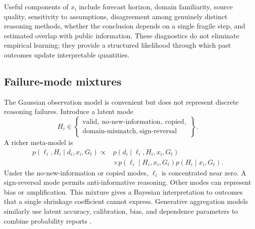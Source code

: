 \documentclass[journal,a4paper]{IEEEtran}
\begin{document}
Useful components of $x_i$ include forecast horizon, domain familiarity, source quality, sensitivity to assumptions, disagreement among genuinely distinct reasoning methods, whether the conclusion depends on a single fragile step, and estimated overlap with public information. These diagnostics do not eliminate empirical learning; they provide a structured likelihood through which past outcomes update interpretable quantities.

\subsection{Failure-mode mixtures}
The Gaussian observation model is convenient but does not represent discrete reasoning failures. Introduce a latent mode
\begin{equation}
H_i\in
\left\{
\begin{array}{c}
\text{valid},\ \text{no-new-information},\ \text{copied},\\
\text{domain-mismatch},\ \text{sign-reversal}
\end{array}
\right\}.
\end{equation}
A richer meta-model is
\begin{equation}
\begin{split}
p(\ell_i,H_i\mid d_i,x_i,G_t)
\propto{}&
 p(d_i\mid\ell_i,H_i,x_i,G_t)\\
&\times p(\ell_i\mid H_i,x_i,G_t)
 p(H_i\mid x_i,G_t).
\end{split}
\label{eq:failure-mixture}
\end{equation}
Under the no-new-information or copied modes, $\ell_i$ is concentrated near zero. A sign-reversal mode permits anti-informative reasoning. Other modes can represent bias or amplification. This mixture gives a Bayesian interpretation to outcomes that a single shrinkage coefficient cannot express. Generative aggregation models similarly use latent accuracy, calibration, bias, and dependence parameters to combine probability reports \cite{kahn2012}.
\end{document}
